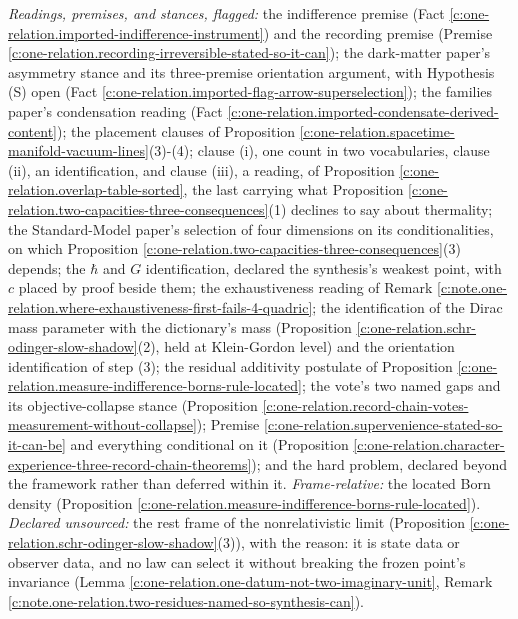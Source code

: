 \documentclass[11pt]{article}
\theoremstyle{definition}
\theoremstyle{plain}
\begin{document}
\emph{Readings, premises, and stances, flagged:} the indifference premise (Fact \ref{c:one-relation.imported-indifference-instrument}) and the recording premise (Premise \ref{c:one-relation.recording-irreversible-stated-so-it-can}); the dark-matter paper's asymmetry stance and its three-premise orientation argument, with Hypothesis (S) open (Fact \ref{c:one-relation.imported-flag-arrow-superselection}); the families paper's condensation reading (Fact \ref{c:one-relation.imported-condensate-derived-content}); the placement clauses of Proposition \ref{c:one-relation.spacetime-manifold-vacuum-lines}(3)-(4); clause (i), one count in two vocabularies, clause (ii), an identification, and clause (iii), a reading, of Proposition \ref{c:one-relation.overlap-table-sorted}, the last carrying what Proposition \ref{c:one-relation.two-capacities-three-consequences}(1) declines to say about thermality; the Standard-Model paper's selection of four dimensions on its conditionalities, on which Proposition \ref{c:one-relation.two-capacities-three-consequences}(3) depends; the $\hbar$ and $G$ identification, declared the synthesis's weakest point, with $c$ placed by proof beside them; the exhaustiveness reading of Remark \ref{c:note.one-relation.where-exhaustiveness-first-fails-4-quadric}; the identification of the Dirac mass parameter with the dictionary's mass (Proposition \ref{c:one-relation.schr-odinger-slow-shadow}(2), held at Klein-Gordon level) and the orientation identification of step (3); the residual additivity postulate of Proposition \ref{c:one-relation.measure-indifference-borns-rule-located}; the vote's two named gaps and its objective-collapse stance (Proposition \ref{c:one-relation.record-chain-votes-measurement-without-collapse}); Premise \ref{c:one-relation.supervenience-stated-so-it-can-be} and everything conditional on it (Proposition \ref{c:one-relation.character-experience-three-record-chain-theorems}); and the hard problem, declared beyond the framework rather than deferred within it. \emph{Frame-relative:} the located Born density (Proposition \ref{c:one-relation.measure-indifference-borns-rule-located}). \emph{Declared unsourced:} the rest frame of the nonrelativistic limit (Proposition \ref{c:one-relation.schr-odinger-slow-shadow}(3)), with the reason: it is state data or observer data, and no law can select it without breaking the frozen point's invariance (Lemma \ref{c:one-relation.one-datum-not-two-imaginary-unit}, Remark \ref{c:note.one-relation.two-residues-named-so-synthesis-can}).
\end{document}
